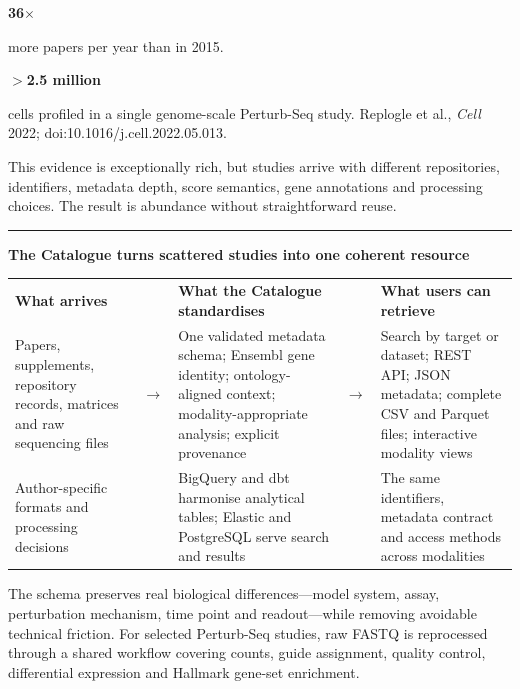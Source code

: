 \documentclass[20pt]{extarticle}
\newcommand{\sectiontitle}[2]{%
  \vspace{3mm}%
  {\color{#1}\rule{\linewidth}{1.8mm}}\par\vspace{2mm}%
  {\fontsize{44}{50}\selectfont\bfseries #2}\par\vspace{4mm}}
\newcommand{\bodycopy}{\fontsize{29}{36}\selectfont}
\newcommand{\smallcopy}{\fontsize{24}{30}\selectfont}
\newcommand{\tinycopy}{\fontsize{18}{22}\selectfont}
\newcommand{\subhead}[2]{{\fontsize{32}{38}\selectfont\bfseries\color{#1}#2}\par\vspace{2mm}}
\newcommand{\bignumber}[2]{{\fontsize{46}{50}\selectfont\bfseries\color{#1}#2}}
\begin{document}
\begin{minipage}[t]{0.37\linewidth}
  \vspace{0pt}
  \bignumber{Evidence}{36$\times$}\par
  {\bodycopy more papers per year than in 2015.}

  \vspace{7mm}
  \bignumber{Evidence}{$>$2.5 million}\par
  {\bodycopy cells profiled in a single genome-scale Perturb-Seq study.}
  {\tinycopy\color{Muted}Replogle et al., \emph{Cell} 2022; doi:10.1016/j.cell.2022.05.013.}

  \vspace{7mm}
  {\bodycopy
  This evidence is exceptionally rich, but studies arrive with different repositories, identifiers, metadata depth,
  score semantics, gene annotations and processing choices. The result is abundance without straightforward reuse.}
\end{minipage}

\vfill

\sectiontitle{Catalogue}{The Catalogue turns scattered studies into one coherent resource}
{\smallcopy
\renewcommand{\arraystretch}{1.2}
\setlength{\tabcolsep}{4mm}
\begin{tabularx}{\linewidth}{@{}Y >{\centering\arraybackslash}p{22mm} Y >{\centering\arraybackslash}p{22mm} Y@{}}
  \subhead{Problem}{What arrives} && \subhead{Catalogue}{What the Catalogue standardises} && \subhead{Evidence}{What users can retrieve} \\
  Papers, supplements, repository records, matrices and raw sequencing files
  & {\fontsize{35}{38}\selectfont\color{Muted}$\longrightarrow$} &
  One validated metadata schema; Ensembl gene identity; ontology-aligned context; modality-appropriate analysis; explicit provenance
  & {\fontsize{35}{38}\selectfont\color{Muted}$\longrightarrow$} &
  Search by target or dataset; REST API; JSON metadata; complete CSV and Parquet files; interactive modality views \\
  \addlinespace[4mm]
  Author-specific formats and processing decisions
  && BigQuery and dbt harmonise analytical tables; Elastic and PostgreSQL serve search and results
  && The same identifiers, metadata contract and access methods across modalities
\end{tabularx}}

\vspace{3mm}
{\bodycopy
The schema preserves real biological differences—model system, assay, perturbation mechanism, time point and readout—while
removing avoidable technical friction. For selected Perturb-Seq studies, raw FASTQ is reprocessed through a shared workflow
covering counts, guide assignment, quality control, differential expression and Hallmark gene-set enrichment.}
\end{document}

